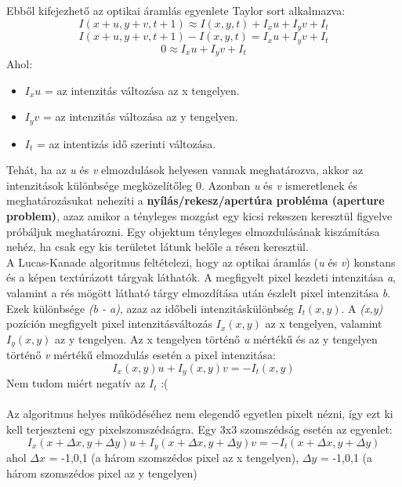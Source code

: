 \documentclass[12pt]{report}
\begin{document}
\begin{enumerate}
                    Ebből kifejezhető az optikai áramlás egyenlete Taylor sort alkalmazva:
                    \[I(x + u,y + v,t + 1) \approx I(x,y,t) + I_xu + I_yv + I_t\]
                    \[I(x + u,y + v,t + 1) - I(x,y,t) = I_xu + I_yv + I_t\]
                    \[0 \approx I_xu + I_yv + I_t\]
                    Ahol:
                    \begin{itemize}
                        \item \textit{$I_xu$} = az intenzitás változása az x tengelyen.
                        \item \textit{$I_yv$} = az intenzitás változása az y tengelyen.
                        \item \textit{$I_t$} = az intentizás idő szerinti változása.
                    \end{itemize}
                    Tehát, ha az \textit{u} és \textit{v} elmozdulások helyesen vannak meghatározva, akkor az intenzitások különbsége megközelítőleg 0. Azonban \textit{u} és \textit{v} ismeretlenek és meghatározásukat nehezíti a \textbf{nyílás/rekesz/apertúra probléma (aperture problem)}, azaz amikor a tényleges mozgást egy kicsi rekeszen keresztül figyelve próbáljuk meghatározni. Egy objektum tényleges elmozdulásának kiszámítása nehéz, ha csak egy kis területet látunk belőle a résen keresztül.\\
                    A Lucas-Kanade algoritmus feltételezi, hogy az optikai áramlás (\textit{u} és \textit{v}) konstans és a képen textúrázott tárgyak láthatók. A megfigyelt pixel kezdeti intenzitása \textit{a}, valamint a rés mögött látható tárgy elmozdítása után észlelt pixel intenzitása \textit{b}. Ezek különbsége \textit{(b - a)}, azaz az időbeli intenzitáskülönbség \textit{$I_t(x,y)$}. A \textit{(x,y)} pozíción megfigyelt pixel intenzitásváltozás \textit{$I_x(x,y)$} az x tengelyen, valamint \textit{$I_y(x,y)$} az y tengelyen. Az x tengelyen történő \textit{u} mértékű és az y tengelyen történő \textit{v} mértékű elmozdulás esetén a pixel intenzitása:
                    \[I_x(x,y)u + I_y(x,y)v = -I_t(x,y)\]
                    Nem tudom miért negatív az $I_t$ :(\\\\
                    Az algoritmus helyes működéséhez nem elegendő egyetlen pixelt nézni, így ezt ki kell terjeszteni egy pixelszomszédságra. Egy 3x3 szomszédság esetén az egyenlet:
                    \[I_x(x + \Delta x, y + \Delta y)u + I_y(x + \Delta x, y + \Delta y)v = -I_t(x + \Delta x, y + \Delta y)\] ahol $\Delta x$ = -1,0,1 (a három szomszédos pixel az x tengelyen), $\Delta y$ = -1,0,1 (a három szomszédos pixel az y tengelyen)

\end{enumerate}
\end{document}
